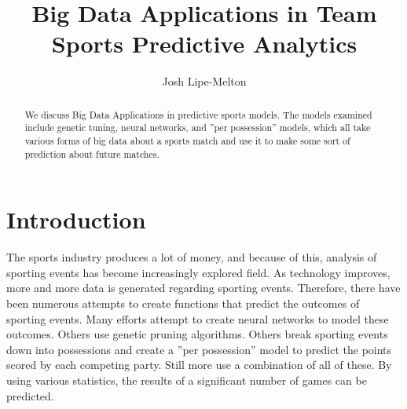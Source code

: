 \documentclass[sigconf]{acmart}
\begin{document}
\title{Big Data Applications in Team Sports Predictive Analytics}
\author{Josh Lipe-Melton}

\renewcommand{\shortauthors}{J. Lipe-Melton}

\begin{abstract}
We discuss Big Data Applications in predictive sports models. The models examined include genetic tuning, neural networks, and ''per possession'' models, which all take various forms of big data about a sports match and use it to make some sort of prediction about future matches.
\end{abstract}


\maketitle

\section{Introduction}
The sports industry produces a lot of money, and because of this, analysis of sporting events has become increasingly explored field. As technology improves, more and more data is generated regarding sporting events. Therefore, there have been numerous attempts to create functions that predict the outcomes of sporting events. Many efforts attempt to create neural networks to model these outcomes. Others use genetic pruning algorithms. Others break sporting events down into possessions and create a ''per possession'' model to predict the points scored by each competing party. Still more use a combination of all of these. By using various statistics, the results of a significant number of games can be predicted.
\end{document}
